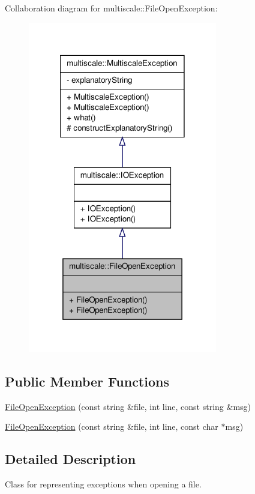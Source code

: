 \-Collaboration diagram for multiscale\-:\-:\-File\-Open\-Exception\-:\nopagebreak
\begin{figure}[H]
\begin{center}
\leavevmode
\includegraphics[width=234pt]{classmultiscale_1_1FileOpenException__coll__graph}
\end{center}
\end{figure}
\subsection*{\-Public \-Member \-Functions}
\begin{DoxyCompactItemize}
\item 
\hyperlink{classmultiscale_1_1FileOpenException_ae574327fb5ac6e396d8c37263f8a2815}{\-File\-Open\-Exception} (const string \&file, int line, const string \&msg)
\item 
\hyperlink{classmultiscale_1_1FileOpenException_adddaf8af54fd3bdeb5f63d5a6736fd45}{\-File\-Open\-Exception} (const string \&file, int line, const char $\ast$msg)
\end{DoxyCompactItemize}


\subsection{\-Detailed \-Description}
\-Class for representing exceptions when opening a file. 

